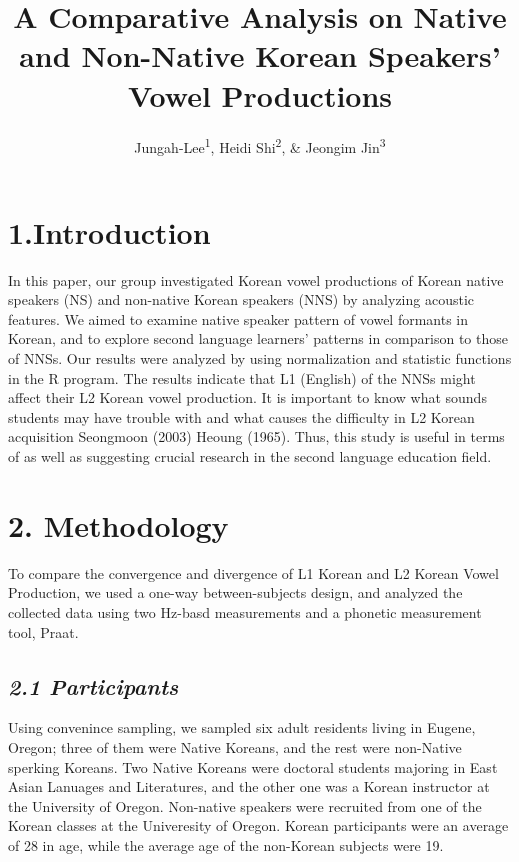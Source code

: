 \documentclass[man, fleqn, noextraspace]{apa6}
\title{A Comparative Analysis on Native and Non-Native Korean Speakers' Vowel
Productions}
\author{Jungah-Lee\textsuperscript{1}, Heidi Shi\textsuperscript{2}, \& Jeongim
Jin\textsuperscript{3}}
\date{}
\affiliation{
\vspace{0.5cm}
\textsuperscript{1} University of Oregon\\\textsuperscript{2} University of Oregon\\\textsuperscript{3} University of Oregon}
\begin{document}
\maketitle

{
\setcounter{tocdepth}{4}
\tableofcontents
}
\newpage

\section{\texorpdfstring{\textbf{1.Introduction}}{1.Introduction}}\label{introduction}

In this paper, our group investigated Korean vowel productions of Korean
native speakers (NS) and non-native Korean speakers (NNS) by analyzing
acoustic features. We aimed to examine native speaker pattern of vowel
formants in Korean, and to explore second language learners' patterns in
comparison to those of NNSs. Our results were analyzed by using
normalization and statistic functions in the R program. The results
indicate that L1 (English) of the NNSs might affect their L2 Korean
vowel production. It is important to know what sounds students may have
trouble with and what causes the difficulty in L2 Korean acquisition
Seongmoon (2003) Heoung (1965). Thus, this study is useful in terms of
as well as suggesting crucial research in the second language education
field.

\section{\texorpdfstring{\textbf{2.
Methodology}}{2. Methodology}}\label{methodology}

To compare the convergence and divergence of L1 Korean and L2 Korean
Vowel Production, we used a one-way between-subjects design, and
analyzed the collected data using two Hz-basd measurements and a
phonetic measurement tool, Praat.

\subsection{\texorpdfstring{\emph{2.1
Participants}}{2.1 Participants}}\label{participants}

Using convenince sampling, we sampled six adult residents living in
Eugene, Oregon; three of them were Native Koreans, and the rest were
non-Native sperking Koreans. Two Native Koreans were doctoral students
majoring in East Asian Lanuages and Literatures, and the other one was a
Korean instructor at the University of Oregon. Non-native speakers were
recruited from one of the Korean classes at the Univeresity of Oregon.
Korean participants were an average of 28 in age, while the average age
of the non-Korean subjects were 19.
\end{document}
